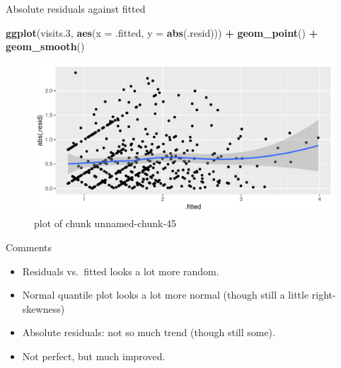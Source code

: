 \documentclass[ignorenonframetext,]{beamer}
\newenvironment{Shaded}{\begin{snugshade}}{\end{snugshade}}
\newcommand{\DataTypeTok}[1]{\textcolor[rgb]{0.13,0.29,0.53}{#1}}
\newcommand{\FloatTok}[1]{\textcolor[rgb]{0.00,0.00,0.81}{#1}}
\newcommand{\KeywordTok}[1]{\textcolor[rgb]{0.13,0.29,0.53}{\textbf{#1}}}
\newcommand{\NormalTok}[1]{#1}
\newcommand{\OperatorTok}[1]{\textcolor[rgb]{0.81,0.36,0.00}{\textbf{#1}}}
\newcommand{\StringTok}[1]{\textcolor[rgb]{0.31,0.60,0.02}{#1}}
\begin{document}
\begin{frame}[fragile]{Absolute residuals against fitted}
\protect\hypertarget{absolute-residuals-against-fitted}{}

\begin{Shaded}
\begin{Highlighting}[]
\KeywordTok{ggplot}\NormalTok{(visits}\FloatTok{.3}\NormalTok{, }\KeywordTok{aes}\NormalTok{(}\DataTypeTok{x =}\NormalTok{ .fitted, }\DataTypeTok{y =} \KeywordTok{abs}\NormalTok{(.resid))) }\OperatorTok{+}
\StringTok{  }\KeywordTok{geom_point}\NormalTok{() }\OperatorTok{+}\StringTok{ }\KeywordTok{geom_smooth}\NormalTok{()}
\end{Highlighting}
\end{Shaded}

\begin{figure}
\centering
\includegraphics{figure/unnamed-chunk-45-1.pdf}
\caption{plot of chunk unnamed-chunk-45}
\end{figure}

\end{frame}

\begin{frame}{Comments}
\protect\hypertarget{comments-6}{}

\begin{itemize}
\item
  Residuals vs.~fitted looks a lot more random.
\item
  Normal quantile plot looks a lot more normal (though still a little
  right-skewness)
\item
  Absolute residuals: not so much trend (though still some).
\item
  Not perfect, but much improved.
\end{itemize}

\end{frame}
\end{document}

